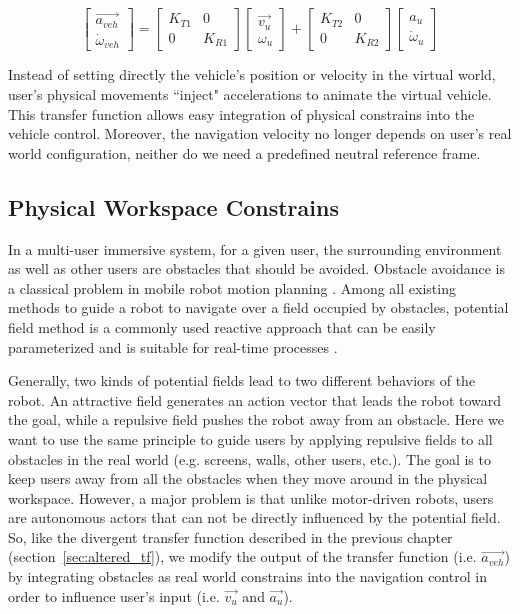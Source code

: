 \begin{equation}
\label{eq:transfer_func}
\begin{bmatrix}
\overrightarrow{a_{veh}} \\ \dot{\omega}_{veh}
\end{bmatrix}=
\begin{bmatrix}
K_{T1} & 0 \\ 0 & K_{R1}
\end{bmatrix}
\begin{bmatrix}
\overrightarrow{v_{u}} \\ \omega_{u}
\end{bmatrix} + 
\begin{bmatrix}
K_{T2} & 0 \\ 0 & K_{R2}
\end{bmatrix}
\begin{bmatrix}
a_{u} \\ \dot{\omega}_{u}
\end{bmatrix}
\end{equation}

Instead of setting directly the vehicle's position or velocity in the virtual world, user's physical movements ``inject" accelerations to animate the virtual vehicle. This transfer function allows easy integration of physical constrains into the vehicle control. Moreover, the navigation velocity no longer depends on user's real world configuration, neither do we need a predefined neutral reference frame.


\subsection{Physical Workspace Constrains}
In a multi-user immersive system, for a given user, the surrounding environment as well as other users are obstacles that should be avoided. Obstacle avoidance is a classical problem in mobile robot motion planning \citep{Latombe2012Robot}. Among all existing methods to guide a robot to navigate over a field occupied by obstacles, potential field method is a commonly used reactive approach that can be easily parameterized and is suitable for real-time processes \citep{Khatib1986Real, Hellstrom2011Robot}.

Generally, two kinds of potential fields lead to two different behaviors of the robot. An attractive field generates an action vector that leads the robot toward the goal, while a repulsive field pushes the robot away from an obstacle. Here we want to use the same principle to guide users by applying repulsive fields to all obstacles in the real world (e.g. screens, walls, other users, etc.). The goal is to keep users away from all the obstacles when they move around in the physical workspace. However, a major problem is that unlike motor-driven robots, users are autonomous actors that can not be directly influenced by the potential field. So, like the divergent transfer function described in the previous chapter (section~\ref{sec:altered_tf}), we modify the output of the transfer function (i.e. $\overrightarrow{a_{veh}}$) by integrating obstacles as real world constrains into the navigation control in order to influence user's input (i.e. $\overrightarrow{v_{u}}$ and $\overrightarrow{a_{u}}$).


